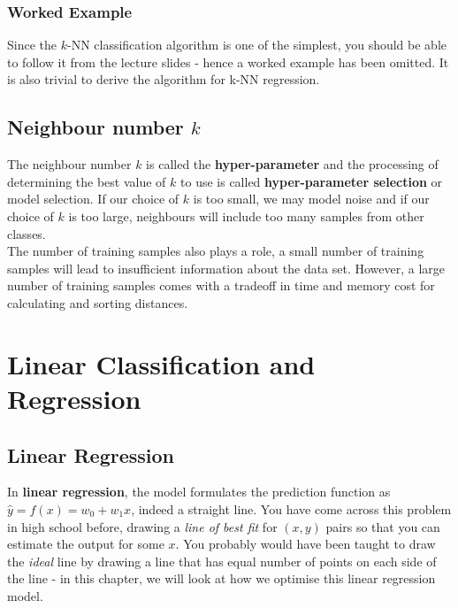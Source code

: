 \documentclass[11pt,fleqn]{book} %
\begin{document}
\subsection*{Worked Example}
Since the $k$-NN classification algorithm is one of the simplest, you should be able to follow it from the lecture slides - hence a worked example has been omitted. It is also trivial to derive the algorithm for k-NN regression.

\section{Neighbour number $k$}
The neighbour number $k$ is called the \textbf{hyper-parameter} and the processing of determining the best value of $k$ to use is called \textbf{hyper-parameter selection} or model selection. If our choice of $k$ is too small, we may model noise and if our choice of $k$ is too large, neighbours will include too many samples from other classes.\\

\noindent
The number of training samples also plays a role, a small number of training samples will lead to insufficient information about the data set. However, a large number of training samples comes with a tradeoff in time and memory cost for calculating and sorting distances.



\chapter{Linear Classification and Regression}

\section{Linear Regression}
In \textbf{linear regression}, the model formulates the prediction function as $\hat{y} = f(x) = w_0 + w_1x$, indeed a straight line. You have come across this problem in high school before, drawing a \textit{line of best fit} for $(x, y)$ pairs so that you can estimate the output for some $x$. You probably would have been taught to draw the \textit{ideal} line by drawing a line that has equal number of points on each side of the line - in this chapter, we will look at how we optimise this linear regression model.\\
\end{document}
